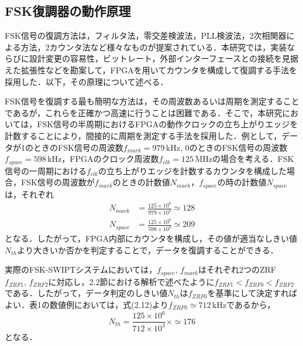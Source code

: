 \subsection{FSK復調器の動作原理}
FSK信号の復調方法は，フィルタ法\cite{Araki1985}，零交差検波法\cite{Araki1985}，PLL検波法\cite{Yanagisawa1998}，2次相関器による方法\cite{Gardner1996}，2カウンタ法\cite{Sankar2017}など様々なものが提案されている．本研究では，実装ならびに設計変更の容易性，ビットレート，外部インターフェースとの接続を見据えた拡張性などを勘案して，FPGAを用いてカウンタを構成して復調する手法を採用した．以下，その原理について述べる．\par 
FSK信号を復調する最も簡明な方法は，その周波数あるいは周期を測定することであるが，これらを正確かつ高速に行うことは困難である．そこで，本研究においては，FSK信号の半周期におけるFPGAの動作クロックの立ち上がりエッジを計数することにより，間接的に周期を測定する手法を採用した．例として，データが1のときのFSK信号の周波数$f_{mark}=979 \, \mathrm{kHz}$, 0のときのFSK信号の周波数$f_{space}=598 \, \mathrm{kHz}$，FPGAのクロック周波数$f_{clk}=125 \, \mathrm{MHz}$の場合を考える．FSK信号の一周期における$f_{clk}$の立ち上がりエッジを計数するカウンタを構成した場合，FSK信号の周波数が$f_{mark}$のときの計数値$N_{mark}$，$f_{space}$の時の計数値$N_{space}$は，それぞれ
\begin{align}
N_{mark} &=\frac{125 \times 10^6}{979 \times 10^3}\simeq 128 \\
N_{space} &=\frac{125 \times 10^6}{598 \times 10^3} \simeq 209
\end{align}
となる．したがって，FPGA内部にカウンタを構成し，その値が適当なしきい値$N_{th}$より大きいか否かを判定することで，データを復調することができる．\par 
実際のFSK-SWIPTシステムにおいては，$f_{space}, \, f_{mark}$はそれぞれ2つのZRF$f_{ZRF1}, \, f_{ZRF2}$に対応し，2.2節における解析で述べたように$f_{ZRF1}<f_{ZRF0}<f_{ZRF2}$である．したがって，データ判定のしきい値$N_{th}$は$f_{ZRF0}$を基準にして決定すればよい．表1の数値例においては，式(2.12)より$f_{ZRF0} \simeq712 \, \mathrm{kHz}$であるから，
\begin{equation}
N_{th} =\frac{125 \times 10^6}{712 \times 10^3} \times \simeq 176
\end{equation}
となる．

